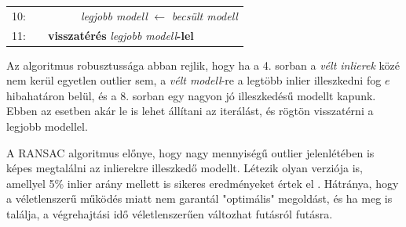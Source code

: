 \begin{tabularx}{\textwidth}{rlllllllll}
10: \hspace{5pt} & \hspace{20pt} & \hspace{20pt} & \hspace{20pt} & \hspace{20pt} & \multicolumn{5}{l}{\textit{legjobb modell} $\leftarrow$ \textit{becsült modell}} \\
11: \hspace{5pt} & \hspace{20pt} & \multicolumn{8}{l}{\textbf{visszatérés} \textit{legjobb modell}\textbf{-lel}} \\
\hline
\end{tabularx}
\vspace{5mm}

Az algoritmus robusztussága abban rejlik, hogy ha a 4. sorban a \textit{vélt inlierek} közé nem kerül egyetlen outlier sem, a \textit{vélt modell}-re a legtöbb inlier illeszkedni fog $e$ hibahatáron belül, és a 8. sorban egy nagyon jó illeszkedésű modellt kapunk. Ebben az esetben akár le is lehet állítani az iterálást, és rögtön visszatérni a legjobb modellel.

A RANSAC algoritmus előnye, hogy nagy mennyiségű outlier jelenlétében is képes megtalálni az inlierekre illeszkedő modellt. Létezik olyan verziója is, amellyel 5\% inlier arány mellett is sikeres eredményeket értek el \cite{ransac5}. Hátránya, hogy a véletlenszerű működés miatt nem garantál "optimális" megoldást, és ha meg is találja, a végrehajtási idő véletlenszerűen változhat futásról futásra.
